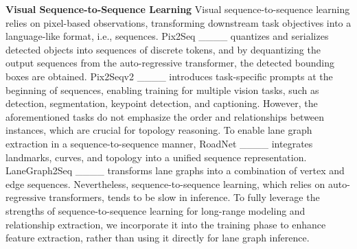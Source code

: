 \textbf{Visual Sequence-to-Sequence Learning}
Visual sequence-to-sequence learning relies on pixel-based observations, transforming downstream task objectives into a language-like format, i.e., sequences. Pix2Seq ____ quantizes and serializes detected objects into sequences of discrete tokens, and by dequantizing the output sequences from the auto-regressive transformer, the detected bounding boxes are obtained. Pix2Seqv2 ____ introduces task-specific prompts at the beginning of sequences, enabling training for multiple vision tasks, such as detection, segmentation, keypoint detection, and captioning. However, the aforementioned tasks do not emphasize the order and relationships between instances, which are crucial for topology reasoning. To enable lane graph extraction in a sequence-to-sequence manner, RoadNet ____ integrates landmarks, curves, and topology into a unified sequence representation. LaneGraph2Seq ____ transforms lane graphs into a combination of vertex and edge sequences. Nevertheless, sequence-to-sequence learning, which relies on auto-regressive transformers, tends to be slow in inference. To fully leverage the strengths of sequence-to-sequence learning for long-range modeling and relationship extraction, we incorporate it into the training phase to enhance feature extraction, rather than using it directly for lane graph inference.
